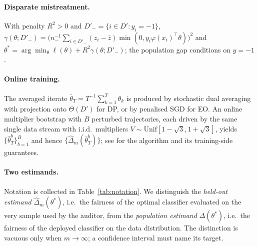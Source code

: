 \documentclass[10pt,twocolumn]{article}
\newcommand{\dhat}{\hat\Delta}
\newcommand{\tbar}{\bar\theta}
\newcommand{\Dp}{D'}
\begin{document}
\paragraph{Disparate mistreatment.} With penalty $R^2>0$ and $\Dp_-=\{i\in\Dp:y_i=-1\}$,
$\gamma(\theta;\Dp_-)=\big(n_-^{-1}\sum_{i\in\Dp_-}(z_i-\bar z)\min(0,y_i\varphi(x_i)^\top
\theta)\big)^2$ and $\theta^*=\arg\min_\theta \ell(\theta)+R^2\gamma(\theta;\Dp_-)$; the population
gap conditions on $y=-1$.

\paragraph{Online training.} The averaged iterate $\tbar_T=T^{-1}\sum_{k=1}^T\theta_k$ is produced by
stochastic dual averaging with projection onto $\Theta(\Dp)$ for DP, or by penalised SGD for EO.  An
online multiplier bootstrap with $B$ perturbed trajectories, each driven by the same single data
stream with i.i.d.\ multipliers $V\sim\mathrm{Unif}[1-\sqrt3,1+\sqrt3]$, yields
$\{\hat\theta^b_T\}_{b=1}^B$ and hence $\{\dhat_m(\bar\theta^b_T)\}$; see \citet{roy2026uq} for the
algorithm and its training-side guarantees.

\paragraph{Two estimands.} Notation is collected in Table~\ref{tab:notation}.  We distinguish the \emph{held-out estimand} $\dhat_m(\theta^*)$, i.e.\ the
fairness of the optimal classifier evaluated on the very sample used by the auditor, from the
\emph{population estimand} $\Delta(\theta^*)$, i.e.\ the fairness of the deployed classifier on the
data distribution.  The distinction is vacuous only when $m\to\infty$; a confidence interval must
name its target.
\end{document}
